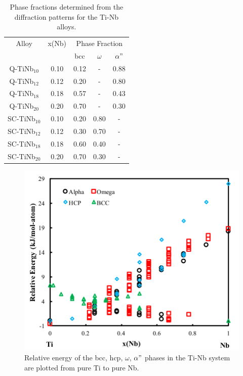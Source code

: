 \newpage
\begin{table}[H]
	\caption{Phase fractions determined from the diffraction patterns for the Ti-Nb alloys.}
	\centering
	\begin{tabular}{ c c c c c }
		\hline
		Alloy & x(Nb) & \multicolumn{3}{c}{Phase Fraction} \\
		&  & bcc & $\omega$ & $\alpha"$ \\
		\hline
		Q-TiNb$_{10}$ & 0.10 & 0.12 & - & 0.88 \\
		Q-TiNb$_{12}$ & 0.12 & 0.20 & - & 0.80 \\
		Q-TiNb$_{18}$ & 0.18 & 0.57 & - & 0.43 \\
		Q-TiNb$_{20}$ & 0.20 & 0.70 & - & 0.30 \\
		SC-TiNb$_{10}$ & 0.10 & 0.20 & 0.80 & - \\
		SC-TiNb$_{12}$ & 0.12 & 0.30 & 0.70 & - \\
		SC-TiNb$_{18}$ & 0.18 & 0.60 & 0.40 & - \\
		SC-TiNb$_{20}$ & 0.20 & 0.70 & 0.30 & - \\
		\hline
	\end{tabular}
	\label{Ch7-table:phasefrac}
\end{table}
\clearpage

\pagebreak
\begin{figure}[H]
	\centering
	\includegraphics[width=\textwidth]{Chapter-7/Figures/tinb0k.png}
	\caption{Relative energy of the bcc, hcp, $\omega$, $\alpha"$ phases in the Ti-Nb system are plotted from pure Ti to pure Nb.}
	\label{Ch7-figure:tinb0K}
\end{figure}


